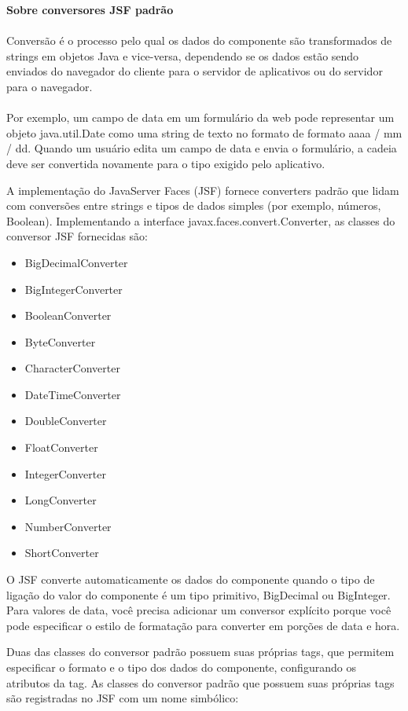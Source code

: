 \documentclass[	DIV=calc,%
							paper=a4,%
							fontsize=12pt,%
							onecolumn]{scrartcl}	 					%
\begin{document}
\textbf{Sobre conversores JSF padrão}\\~\\

Conversão é o processo pelo qual os dados do componente são transformados de strings em objetos Java e vice-versa, dependendo se os dados estão sendo enviados do navegador do cliente para o servidor de aplicativos ou do servidor para o navegador.\\~\\

Por exemplo, um campo de data em um formulário da web pode representar um objeto java.util.Date como uma string de texto no formato de formato aaaa / mm / dd. Quando um usuário edita um campo de data e envia o formulário, a cadeia deve ser convertida novamente para o tipo exigido pelo aplicativo.

A implementação do JavaServer Faces (JSF) fornece converters padrão que lidam com conversões entre strings e tipos de dados simples (por exemplo, números, Boolean). Implementando a interface javax.faces.convert.Converter, as classes do conversor JSF fornecidas são:
\begin{itemize}
\item BigDecimalConverter
\item BigIntegerConverter
\item BooleanConverter
\item ByteConverter
\item CharacterConverter
\item DateTimeConverter
\item DoubleConverter
\item FloatConverter
\item IntegerConverter
\item LongConverter
\item NumberConverter
\item ShortConverter
\end{itemize}

O JSF converte automaticamente os dados do componente quando o tipo de ligação do valor do componente é um tipo primitivo, BigDecimal ou BigInteger. Para valores de data, você precisa adicionar um conversor explícito porque você pode especificar o estilo de formatação para converter em porções de data e hora.

Duas das classes do conversor padrão possuem suas próprias tags, que permitem especificar o formato e o tipo dos dados do componente, configurando os atributos da tag. As classes do conversor padrão que possuem suas próprias tags são registradas no JSF com um nome simbólico:\\~\\
\end{document}
